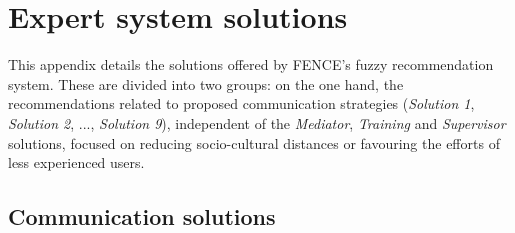 \chapter{Expert system solutions}
\label{cap:annexB}

This appendix details the solutions offered by FENCE's fuzzy recommendation system. These are divided into two groups: on the one hand, the recommendations related to proposed communication strategies (\emph{Solution 1}, \emph{Solution 2}, ..., \emph{Solution 9}), independent of the \emph{Mediator}, \emph{Training} and \emph{Supervisor} solutions, focused on reducing socio-cultural distances or favouring the efforts of less experienced users.

\section{Communication solutions}

